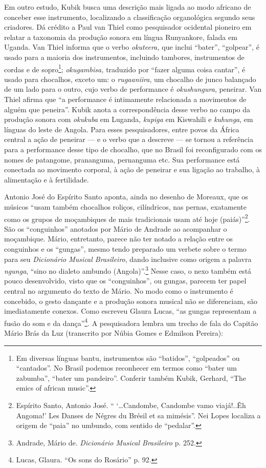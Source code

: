 Em outro estudo, Kubik busca uma descrição mais ligada ao modo africano
de conceber esse instrumento, localizando a classificação organológica
segundo seus criadores. Dá crédito a Paul van Thiel como pesquisador
ocidental pioneiro em relatar a taxonomia da produção sonora em língua
Runyankore, falada em Uganda. Van Thiel informa que o verbo
\emph{okuteera,} que inclui ``bater'', ``golpear'', é usado para a
maioria dos instrumentos, incluindo tambores, instrumentos de cordas e
de sopro\footnote{Em diversas línguas bantu, instrumentos são
  ``batidos'', ``golpeados'' ou ``cantados''. No Brasil podemos
  reconhecer em termos como ``bater um zabumba'', ``bater um pandeiro''.
  Conferir também Kubik, Gerhard, ``The emics of african music''.};
\emph{okugambisa,} traduzido por ``fazer alguma coisa cantar'', é usado
para chocalhos, exceto um: o \emph{rugaaniira}, um chocalho de junco
balançado de um lado para o outro, cujo verbo de performance é
\emph{okushungura}, peneirar. Van Thiel afirma que ``a performance é
intimamente relacionada a movimentos de alguém que peneira''. Kubik
anota a correspondência desse verbo no campo da produção sonora com
\emph{okukuba} em Luganda, \emph{kupiga} em Kiswahili e \emph{kuhunga},
em línguas do leste de Angola. Para esses pesquisadores, entre povos da
África central a ação de peneirar --- e o verbo que a descreve --- se
tornou a referência para a performance desse tipo de chocalho, que no
Brasil foi reconfigurado com os nomes de patangome, prananguma,
pernanguma etc. Sua performance está conectada ao movimento corporal, à
ação de peneirar e sua ligação ao trabalho, à alimentação e à
fertilidade.

Antonio José do Espírito Santo aponta, ainda no desenho de Moreaux, que
os músicos ``usam também chocalhos roliços, cilíndricos, nas pernas,
exatamente como os grupos de moçambiques de  mais tradicionais usam
até hoje (paiás)''\footnote{Espírito Santo, Antonio José. ``
  `\ldots{}Candombe, Candombe vamo viajá!..Êh Angoma!' Les Danses de
  Négres du Brésil et sa mimésis''. Nei Lopes localiza a origem de
  ``paia'' no umbundo, com sentido de ``pedalar''.}. São os
``conguinhos'' anotados por Mário de Andrade ao acompanhar o moçambique.
Mário, entretanto, parece não ter notado a relação entre os conguinhos e
os ``gungas'', mesmo tendo preparado um verbete sobre o termo para seu
\emph{Dicionário Musical Brasileiro}, dando inclusive como origem a
palavra \emph{ngunga}, ``sino no dialeto ambundo (Angola)''.\footnote{Andrade,
  Mário de. \emph{Dicionário Musical Brasileiro} p. 252.} Nesse caso, o nexo também está
pouco desenvolvido, visto que os ``conguinhos'', ou gungas, parecem ter
papel central no argumento do texto de Mário. No modo como o instrumento
é concebido, o gesto dançante e a produção sonora musical não se
diferenciam, são imediatamente conexos. Como escreveu Glaura Lucas, ``as
gungas representam a fusão do som e da dança''\footnote{Lucas, Glaura.
  ``Os sons do Rosário'' p. 92.}. A pesquisadora lembra um trecho de
fala do Capitão Mário Brás da Luz (transcrito por Núbia Gomes e Edmilson
Pereira):

